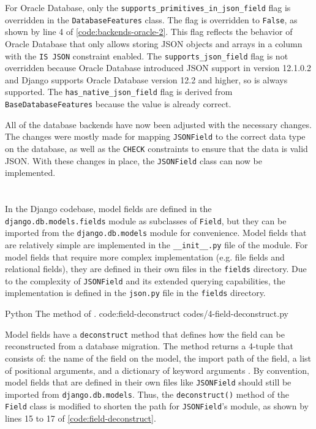 For Oracle Database, only the \verb|supports_primitives_in_json_field| flag is
overridden in the \verb|DatabaseFeatures| class. The flag is overridden to
\verb|False|, as shown by line 4 of \autoref{code:backends-oracle-2}. This flag
reflects the behavior of Oracle Database that only allows storing JSON objects
and arrays in a column with the \verb|IS JSON| constraint enabled. The
\verb|supports_json_field| flag is not overridden because Oracle Database
introduced JSON support in version 12.1.0.2 and Django supports Oracle Database
version 12.2 and higher, so  is always supported. The
\verb|has_native_json_field| flag is derived from \verb|BaseDatabaseFeatures|
because the value is already correct.

All of the database backends have now been adjusted with the necessary changes.
The changes were mostly made for mapping \verb|JSONField| to the correct data
type on the database, as well as the \verb|CHECK| constraints to ensure that
the data is valid JSON. With these changes in place, the \verb|JSONField| class
can now be implemented.

\section{}

In the Django codebase, model fields are defined in the
\verb|django.db.models.fields| module as subclasses of \verb|Field|, but they
can be imported from the \verb|django.db.models| module for convenience. Model
fields that are relatively simple are implemented in the \verb|__init__.py|
file of the module. For model fields that require more complex implementation
(e.g. file fields and relational fields), they are defined in their own files
in the \verb|fields| directory. Due to the complexity of \verb|JSONField| and
its extended querying capabilities, the implementation is defined in the
\verb|json.py| file in the \verb|fields| directory.

\listing
{Python}
{The  method of .}
{code:field-deconstruct}
{codes/4-field-deconstruct.py}

Model fields have a \verb|deconstruct| method that defines how the field can be
reconstructed from a database migration. The method returns a 4-tuple that
consists of: the name of the field on the model, the import path of the field,
a list of positional arguments, and a dictionary of keyword arguments
\cite{django:model_fields}. By convention, model fields that are defined in
their own files like \verb|JSONField| should still be imported from
\verb|django.db.models|. Thus, the \verb|deconstruct()| method of the
\verb|Field| class is modified to shorten the path for \verb|JSONField|'s
module, as shown by lines 15 to 17 of \autoref{code:field-deconstruct}.

